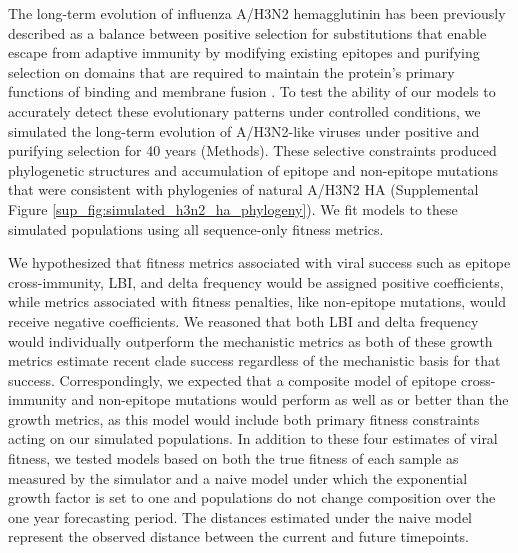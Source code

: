 The long-term evolution of influenza A/H3N2 hemagglutinin has been previously described as a balance between positive selection for substitutions that enable escape from adaptive immunity by modifying existing epitopes and purifying selection on domains that are required to maintain the protein's primary functions of binding and membrane fusion \cite{Bush:1999vj,Neher2013,Luksza:2014hj,Koelle:2015dh}.
To test the ability of our models to accurately detect these evolutionary patterns under controlled conditions, we simulated the long-term evolution of A/H3N2-like viruses under positive and purifying selection for 40 years (Methods).
These selective constraints produced phylogenetic structures and accumulation of epitope and non-epitope mutations that were consistent with phylogenies of natural A/H3N2 HA (Supplemental Figure \ref{sup_fig:simulated_h3n2_ha_phylogeny}).
We fit models to these simulated populations using all sequence-only fitness metrics.

We hypothesized that fitness metrics associated with viral success such as epitope cross-immunity, LBI, and delta frequency would be assigned positive coefficients, while metrics associated with fitness penalties, like non-epitope mutations, would receive negative coefficients.
We reasoned that both LBI and delta frequency would individually outperform the mechanistic metrics as both of these growth metrics estimate recent clade success regardless of the mechanistic basis for that success.
Correspondingly, we expected that a composite model of epitope cross-immunity and non-epitope mutations would perform as well as or better than the growth metrics, as this model would include both primary fitness constraints acting on our simulated populations.
In addition to these four estimates of viral fitness, we tested models based on both the true fitness of each sample as measured by the simulator and a naive model under which the exponential growth factor is set to one and populations do not change composition over the one year forecasting period.
The distances estimated under the naive model represent the observed distance between the current and future timepoints.


